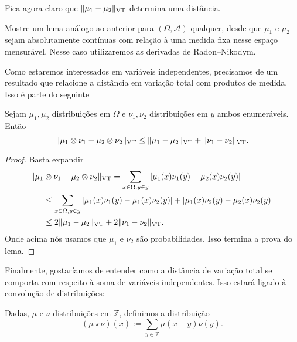 \begin{topics}
Fica agora claro que $\lVert \mu_1 - \mu_2 \rVert_{\operatorname{VT}}$ determina uma distância.

\begin{exercise}
Mostre um lema análogo ao anterior para $(\Omega, \mathcal{A})$ qualquer, desde que $\mu_1$ e $\mu_2$ sejam absolutamente contínuas com relação à uma medida fixa nesse espaço mensurável. Nesse caso utilizaremos as derivadas de Radon–Nikodym.
\end{exercise}

Como estaremos interessados em variáveis independentes, precisamos de um resultado que relacione a distância em variação total com produtos de medida. Isso é parte do seguinte

\begin{lemma}
\label{l:vt_produto}
Sejam $\mu_1, \mu_2$ distribuições em $\Omega$ e $\nu_1, \nu_2$ distribuições em $y$ ambos enumeráveis. Então
\begin{equation}
  \lVert \mu_1 \otimes \nu_1 - \mu_2 \otimes \nu_2 \rVert_{\operatorname{VT}} \leq \lVert \mu_1 - \mu_2 \rVert_{\operatorname{VT}} + \lVert \nu_1 - \nu_2 \rVert_{\operatorname{VT}}.
\end{equation}
\end{lemma}

\begin{proof}
Basta expandir
\begin{equation}
  \begin{split}
    \lVert \mu_1 & \otimes \nu_1 - \mu_2 \otimes \nu_2 \rVert_{\operatorname{VT}} = \sum_{x \in \Omega, y \in y} |\mu_1(x)\nu_1(y) - \mu_2(x)\nu_2(y)|\\
    & \leq \sum_{x \in \Omega, y \in y} |\mu_1(x)\nu_1(y) - \mu_1(x)\nu_2(y)| + |\mu_1(x)\nu_2(y) - \mu_2(x)\nu_2(y)|\\
    & \leq 2\lVert \mu_1 - \mu_2 \rVert_{\operatorname{VT}} + 2\lVert \nu_1 - \nu_2 \rVert_{\operatorname{VT}}.
  \end{split}
\end{equation}
Onde acima nós usamos que $\mu_1$ e $\nu_2$ são probabilidades. Isso termina a prova do lema.
\end{proof}

Finalmente, gostaríamos de entender como a distância de variação total se comporta com respeito à soma de variáveis independentes.
Isso estará ligado à convolução de distribuições:

\begin{definition}
Dadas, $\mu$ e $\nu$ distribuições em $\mathbb{Z}$, definimos a distribuição
\begin{equation}
  (\mu \star \nu)(x) := \sum_{y \in \mathbb{Z}} \mu(x-y) \nu(y).
\end{equation}
\end{definition}


\end{topics}
